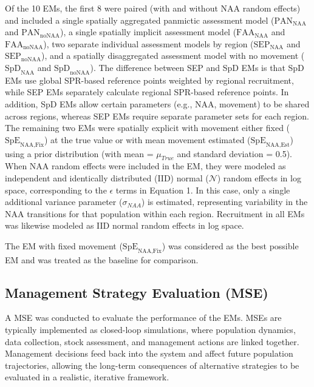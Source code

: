 \documentclass[
  12pt,
]{article}
\begin{document}
Of the 10 EMs, the first 8 were paired (with and without NAA random
effects) and included a single spatially aggregated panmictic assessment
model (\(\text{PAN}_{\scriptscriptstyle \text{NAA}}\) and
\(\text{PAN}_{\scriptscriptstyle \text{noNAA}}\)), a single spatially
implicit assessment model
(\(\text{FAA}_{\scriptscriptstyle \text{NAA}}\) and
\(\text{FAA}_{\scriptscriptstyle \text{noNAA}}\)), two separate
individual assessment models by region
(\(\text{SEP}_{\scriptscriptstyle \text{NAA}}\) and
\(\text{SEP}_{\scriptscriptstyle \text{noNAA}}\)), and a spatially
disaggregated assessment model with no movement
(\(\text{SpD}_{\scriptscriptstyle \text{NAA}}\) and
\(\text{SpD}_{\scriptscriptstyle \text{noNAA}}\)). The difference
between SEP and SpD EMs is that SpD EMs use global SPR-based reference
points weighted by regional recruitment, while SEP EMs separately
calculate regional SPR-based reference points. In addition, SpD EMs
allow certain parameters (e.g., NAA, movement) to be shared across
regions, whereas SEP EMs require separate parameter sets for each
region. The remaining two EMs were spatially explicit with movement
either fixed (\(\text{SpE}_{\scriptscriptstyle \text{NAA,Fix}}\)) at the
true value or with mean movement estimated
(\(\text{SpE}_{\scriptscriptstyle \text{NAA,Est}}\)) using a prior
distribution (with mean = \(\mu_{True}\) and standard deviation = 0.5).
When NAA random effects were included in the EM, they were modeled as
independent and identically distributed (IID) normal (\(\mathcal{N}\))
random effects in log space, corresponding to the \(\epsilon\) terms in
Equation 1. In this case, only a single additional variance parameter
(\(\sigma_{NAA}\)) is estimated, representing variability in the NAA
transitions for that population within each region. Recruitment in all
EMs was likewise modeled as IID normal random effects in log space.

The EM with fixed movement
(\(\text{SpE}_{\scriptscriptstyle \text{NAA,Fix}}\)) was considered as
the best possible EM and was treated as the baseline for comparison.

\hypertarget{management-strategy-evaluation-mse}{%
\subsection{Management Strategy Evaluation
(MSE)}\label{management-strategy-evaluation-mse}}

A MSE was conducted to evaluate the performance of the EMs. MSEs are
typically implemented as closed-loop simulations, where population
dynamics, data collection, stock assessment, and management actions are
linked together. Management decisions feed back into the system and
affect future population trajectories, allowing the long-term
consequences of alternative strategies to be evaluated in a realistic,
iterative framework.
\end{document}
